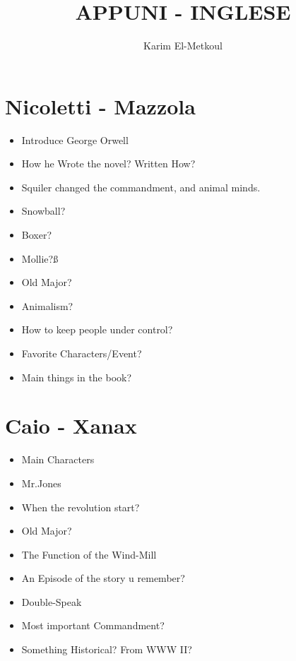 \documentclass{article}
\title{APPUNI - INGLESE}
\author{Karim El-Metkoul}
\begin{document}
\maketitle

\section{Nicoletti - Mazzola}

\vspace{1cm}

\begin{itemize}
    \item Introduce George Orwell
    \item How he Wrote the novel? Written How?
    \item Squiler changed the commandment, and animal minds.
    \item Snowball?
    \item Boxer?
    \item Mollie?ß
    \item Old Major?
    \item Animalism?
    \item How to keep people under control?
    \item Favorite Characters/Event?
    \item Main things in the book?

\end{itemize}   

\section{Caio - Xanax}

\begin{itemize}
    \item Main Characters
    \item Mr.Jones
    \item When the revolution start?
    \item Old Major?
    \item The Function of the Wind-Mill
    \item An Episode of the story u remember?
    \item Double-Speak
    \item Most important Commandment?
    \item Something Historical? From WWW II?
\end{itemize}
\end{document}
